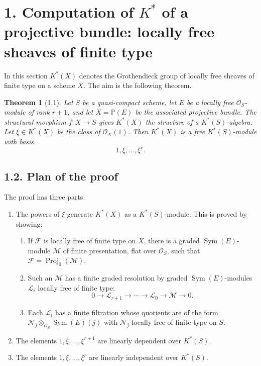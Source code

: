 \documentclass[13pt]{extarticle}
\newcommand{\cO}{\mathcal O}
\newcommand{\Sym}{\operatorname{Sym}}
\newcommand{\Proj}{\operatorname{Proj}}
\newtheorem*{theorem}{Theorem}
\begin{document}
\section*{1. Computation of $K^*$ of a projective bundle: locally free sheaves of finite type}

In this section $K^*(X)$ denotes the Grothendieck group of locally free sheaves of finite type on a scheme $X$. The aim is the following theorem.

\begin{theorem}[1.1]\label{thm:VI.1.1}
Let $S$ be a quasi-compact scheme, let $E$ be a locally free $\cO_S$-module of rank $r+1$, and let $X=\mathbb P(E)$ be the associated projective bundle. The structural morphism $f:X\to S$ gives $K^*(X)$ the structure of a $K^*(S)$-algebra. Let $\xi\in K^*(X)$ be the class of $\cO_X(1)$. Then $K^*(X)$ is a free $K^*(S)$-module with basis
\[
1,\xi,\ldots,\xi^r.
\]
\end{theorem}

\subsection*{1.2. Plan of the proof}
The proof has three parts.
\begin{enumerate}[label=$\arabic*^\circ$)]
\item The powers of $\xi$ generate $K^*(X)$ as a $K^*(S)$-module. This is proved by showing:
\begin{enumerate}[label=(\alph*)]
\item If $\mathcal F$ is locally free of finite type on $X$, there is a graded $\Sym(E)$-module $\mathcal M$ of finite presentation, flat over $\cO_S$, such that $\mathcal F=\Proj_0(\mathcal M)$.
\item Such an $\mathcal M$ has a finite graded resolution by graded $\Sym(E)$-modules $\mathcal L_i$ locally free of finite type:
\[
0\to \mathcal L_{r+1}\to\cdots\to \mathcal L_0\to\mathcal M\to 0.
\]
\item Each $\mathcal L_i$ has a finite filtration whose quotients are of the form $\mathcal N_j\otimes_{\cO_S}\Sym(E)(j)$ with $\mathcal N_j$ locally free of finite type on $S$.
\end{enumerate}
\item The elements $1,\xi,\ldots,\xi^{r+1}$ are linearly dependent over $K^*(S)$.
\item The elements $1,\xi,\ldots,\xi^r$ are linearly independent over $K^*(S)$.
\end{enumerate}
\end{document}
